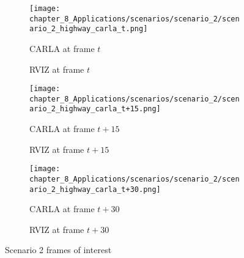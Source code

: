 \begin{figure}[]
	\begin{subfigure}{0.48\textwidth}
		\texttt{[image: chapter\_8\_Applications/scenarios/scenario\_2/scenario\_2\_highway\_carla\_t.png]}
		\caption{\ac{CARLA} at frame $t$}
		\label{subfig:chapter_8_Applications/scenarios/scenario_2/scenario_2_highway_carla_t}
	\end{subfigure}
	\begin{subfigure}{0.48\textwidth}
		\caption{\ac{RVIZ} at frame $t$}
		\label{subfig:chapter_8_Applications/scenarios/scenario_2/scenario_2_highway_rviz_t}
	\end{subfigure}
	\begin{subfigure}{0.48\textwidth}
		\texttt{[image: chapter\_8\_Applications/scenarios/scenario\_2/scenario\_2\_highway\_carla\_t+15.png]}
		\caption{\ac{CARLA} at frame $t+15$}
		\label{subfig:chapter_8_Applications/scenarios/scenario_2/scenario_2_highway_carla_t+15}
	\end{subfigure}
	\begin{subfigure}{0.48\textwidth}
		\caption{\ac{RVIZ} at frame $t+15$}
		\label{subfig:chapter_8_Applications/scenarios/scenario_2/scenario_2_highway_rviz_t+15}
	\end{subfigure}
	\begin{subfigure}{0.48\textwidth}
		\texttt{[image: chapter\_8\_Applications/scenarios/scenario\_2/scenario\_2\_highway\_carla\_t+30.png]}
		\caption{\ac{CARLA} at frame $t+30$}
		\label{subfig:chapter_8_Applications/scenarios/scenario_2/scenario_2_highway_carla_t+30}
	\end{subfigure}
	\hfill
	\begin{subfigure}{0.48\textwidth}
		\caption{\ac{RVIZ} at frame $t+30$}
		\label{subfig:chapter_8_Applications/scenarios/scenario_2/scenario_2_highway_rviz_t+30}
	\end{subfigure}
	\caption{Scenario 2 frames of interest}
	\label{fig:chapter_8_Applications/scenarios/scenario_2_frames_of_interest}
\end{figure}

